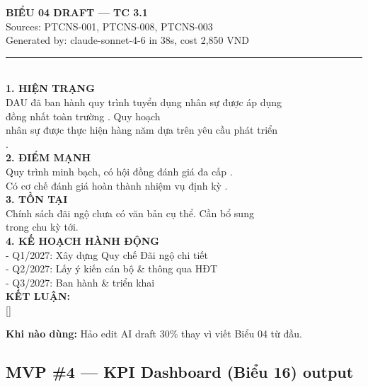 \documentclass[11pt,a4paper]{article}
\begin{document}
\begin{mockbox}
{\bfseries\color{ink} BIỂU 04 DRAFT --- TC 3.1}\\[2pt]
{\color{mid} Sources: PTCNS-001, PTCNS-008, PTCNS-003}\\
{\color{mid} Generated by: claude-sonnet-4-6 in 38s, cost 2,850 VND}\\[6pt]
\rule{\linewidth}{0.3pt}\\[4pt]
{\bfseries\color{ink} 1. HIỆN TRẠNG}\\[2pt]
DAU đã ban hành quy trình tuyển dụng nhân sự được áp dụng\\
đồng nhất toàn trường . Quy hoạch\\
nhân sự được thực hiện hàng năm dựa trên yêu cầu phát triển\\
.\\[6pt]
{\bfseries\color{ink} 2. ĐIỂM MẠNH}\\[2pt]
Quy trình minh bạch, có hội đồng đánh giá đa cấp \fbox{[PTCNS-001]}.\\
Có cơ chế đánh giá hoàn thành nhiệm vụ định kỳ \fbox{[PTCNS-003]}.\\[6pt]
{\bfseries\color{ink} 3. TỒN TẠI}\\[2pt]
Chính sách đãi ngộ chưa có văn bản cụ thể. Cần bổ sung\\
trong chu kỳ tới.\\[6pt]
{\bfseries\color{ink} 4. KẾ HOẠCH HÀNH ĐỘNG}\\[2pt]
- Q1/2027: Xây dựng Quy chế Đãi ngộ chi tiết\\
- Q2/2027: Lấy ý kiến cán bộ \& thông qua HĐT\\
- Q3/2027: Ban hành \& triển khai\\[6pt]
{\bfseries\color{ink} KẾT LUẬN: }\\[6pt]
{[]  }
\end{mockbox}

\textbf{Khi nào dùng:} Hảo edit AI draft 30\% thay vì viết Biểu 04 từ đầu.

\subsection{MVP \#4 — KPI Dashboard (Biểu 16) output}
\end{document}

